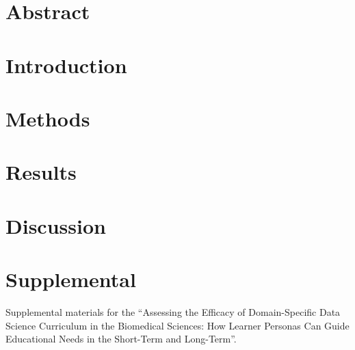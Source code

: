 \documentclass[../main.tex]{subfiles}
\begin{document}
    \section*{Abstract}

        

    \section{Introduction}

        

    \section{Methods}

        

    \section{Results}

        

    \section{Discussion}

        

    \section{Supplemental}

        Supplemental materials for the
        ``Assessing the Efficacy of Domain-Specific Data Science Curriculum in the Biomedical Sciences:
          How Learner Personas Can Guide Educational Needs in the Short-Term and Long-Term''.

        
        
        
        
        
\end{document}

